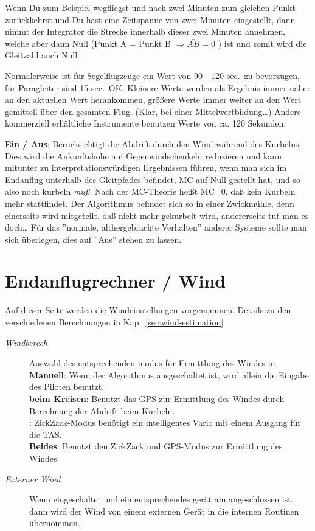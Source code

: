 \begin{description}
Wenn Du zum Beispiel wegfliegst und nach zwei Minuten zum gleichen Punkt zurückkehrst und Du hast eine Zeitspanne von zwei Minuten eingestellt,
dann nimmt der Integrator die Strecke innerhalb dieser zwei Minuten annehmen, welche aber dann Null (Punkt A = Punkt B $\Rightarrow \bar{AB} = 0$ )
ist und somit wird die Gleitzahl auch Null.

Normalerweise ist für Segelflugzeuge ein Wert von 90 - 120 sec.\ zu bevorzugen,
für Paragleiter sind 15 sec.\ OK. Kleinere Werte werden als Ergebnis immer näher an den
aktuellen Wert herankommen, größere Werte immer weiter an den Wert gemittell über den gesamten Flug.
(Klar, bei einer Mittelwertbildung\dots) Andere kommerziell erhältliche Instrumente benutzen Werte von ca. 120 Sekunden.
\item[\textit{Geschätzte Winddrift$^{\textcolor{blue}{\star}}$}]  {\bf Ein / Aus}: Berücksichtigt die Abdrift durch den Wind während des Kurbelns. Dies wird die Ankunftshöhe auf Gegenwindschenkeln reduzieren
und kann mitunter zu interpretationswürdigen Ergebnissen führen,
wenn man sich im Endanflug unterhalb des Gleitpfades befindet, MC auf Null gestellt hat, und so also noch kurbeln \textsl{muß}.
Nach der MC-Theorie heißt MC=0, daß kein Kurbeln mehr stattfindet. Der Algorithmus befindet sich so in einer Zwickmühle, denn einerseits wird mitgeteilt, daß nicht
mehr gekurbelt wird, andererseits tut man es doch\dots
\achtung Für das ''normale, althergebrachte Verhalten'' anderer Systeme sollte man sich überlegen, dies auf ''Aus'' stehen zu lassen.
\end{description}


\section{Endanflugrechner / Wind} \label{sec:final-wind}
Auf dieser Seite werden die Windeinstellungen vorgenommen. Details zu den verschiedenen Berechnungen in Kap.~\ref{sec:wind-estimation}
\begin{description}
\item[\textit{Windberech}]  \label{conf:autowind}  Auswahl des entsprechenden modus für Ermittlung des Windes in \xc \\
  {\bf Manuell}: Wenn der Algorithmus ausgeschaltet ist, wird allein die Eingabe des Piloten benutzt. \\
  {\bf beim Kreisen}: Benutzt das GPS zur Ermittlung des Windes durch Berechnung der Abdrift beim Kurbeln.\\
  : ZickZack-Modus benötigt ein intelligentes Vario  mit einem Ausgang für die TAS.\\
  {\bf Beides}:  Benutzt den ZickZack und GPS-Modus zur Ermittlung des Windes.
\item[\textit{Externer Wind}]  Wenn eingeschaltet und ein entsprechendes gerät am \xc angeschlossen ist, dann wird der Wind von einem
externen Gerät in die internen Routinen übernommen.
\end{description}



